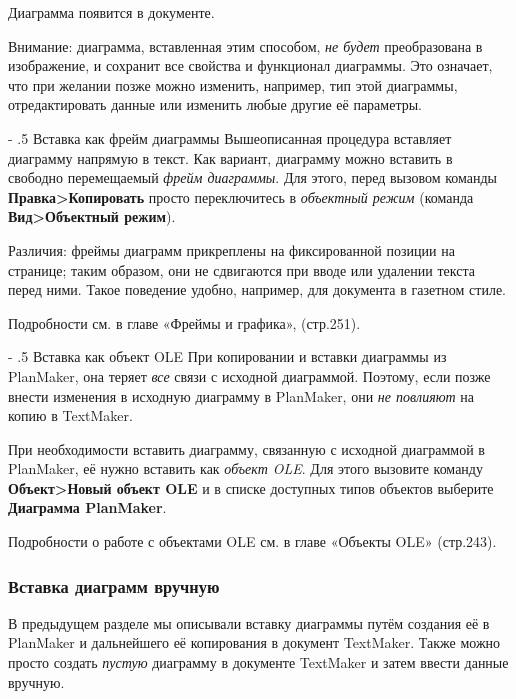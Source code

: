\documentclass[a4paper,10pt]{article}
\makeatletter
\renewcommand\paragraph{%
   \@startsection{paragraph}{4}{0mm}%
      {-\baselineskip}%
      {.5\baselineskip}%
      {\normalfont\normalsize\bfseries}}
\makeatother
\begin{document}
Диаграмма появится в документе.

Внимание: диаграмма, вставленная этим способом, \textit{не будет} преобразована в изображение, и сохранит все свойства и функционал диаграммы. Это означает, что при желании позже можно изменить, например, тип этой диаграммы, отредактировать данные или изменить любые другие её параметры.

\paragraph{Вставка как фрейм диаграммы}
Вышеописанная процедура вставляет диаграмму напрямую в текст. Как вариант, диаграмму можно вставить в свободно перемещаемый \textit{фрейм диаграммы}. Для этого, перед вызовом команды \textbf{Правка>Копировать} просто переключитесь в \textit{объектный режим} (команда \textbf{Вид>Объектный режим}).

Различия: фреймы диаграмм прикреплены на фиксированной позиции на странице; таким образом, они не сдвигаются при вводе или удалении текста перед ними. Такое поведение удобно, например, для документа в газетном стиле.

Подробности см. в главе «Фреймы и графика», (стр.251).

\paragraph{Вставка как объект OLE}
При копировании и вставки диаграммы из PlanMaker, она теряет \textit{все} связи с исходной диаграммой. Поэтому, если позже внести изменения в исходную диаграмму в PlanMaker, они \textit{не повлияют} на копию в TextMaker.

При необходимости вставить диаграмму, связанную с исходной диаграммой в PlanMaker, её нужно вставить как \textit{объект OLE}. Для этого вызовите команду \textbf{Объект>Новый объект OLE} и в списке доступных типов объектов выберите \textbf{Диаграмма PlanMaker}.

Подробности о работе с объектами OLE см. в главе «Объекты OLE» (стр.243).

 \subsubsection{Вставка диаграмм вручную}
 В предыдущем разделе мы описывали вставку диаграммы путём создания её в PlanMaker и дальнейшего её копирования в документ TextMaker. Также можно просто создать \textit{пустую} диаграмму в документе TextMaker и затем ввести данные вручную.
 
\end{document}
